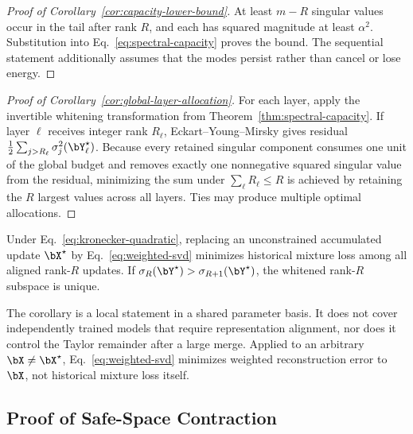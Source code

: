 \begin{proof}[Proof of Corollary~\ref{cor:capacity-lower-bound}]
At least $m-R$ singular values occur in the tail after rank $R$, and each has
squared magnitude at least $\alpha^2$. Substitution into
Eq.~\eqref{eq:spectral-capacity} proves the bound. The sequential statement
additionally assumes that the modes persist rather than cancel or lose energy.
\end{proof}

\begin{proof}[Proof of Corollary~\ref{cor:global-layer-allocation}]
For each layer, apply the invertible whitening transformation from
Theorem~\ref{thm:spectral-capacity}. If layer $\ell$ receives integer rank
$R_\ell$, Eckart--Young--Mirsky gives residual
$\frac12\sum_{j>R_\ell}\sigma_j^2(\bY_\ell^\star)$. Because every retained
singular component consumes one unit of the global budget and removes exactly
one nonnegative squared singular value from the residual, minimizing the sum
under $\sum_\ell R_\ell\leq R$ is achieved by retaining the $R$ largest values
across all layers. Ties may produce multiple optimal allocations.
\end{proof}

\begin{corollary}
\label{cor:merge-consolidation}
Under Eq.~\eqref{eq:kronecker-quadratic}, replacing an unconstrained accumulated
update $\bX^\star$ by Eq.~\eqref{eq:weighted-svd} minimizes historical mixture
loss among all aligned rank-$R$ updates. If
$\sigma_R(\bY^\star)>\sigma_{R+1}(\bY^\star)$, the whitened rank-$R$ subspace is
unique.
\end{corollary}

The corollary is a local statement in a shared parameter basis. It does not
cover independently trained models that require representation alignment, nor
does it control the Taylor remainder after a large merge. Applied to an
arbitrary $\bX\neq\bX^\star$, Eq.~\eqref{eq:weighted-svd} minimizes weighted
reconstruction error to $\bX$, not historical mixture loss itself.

\subsection{Proof of Safe-Space Contraction}

